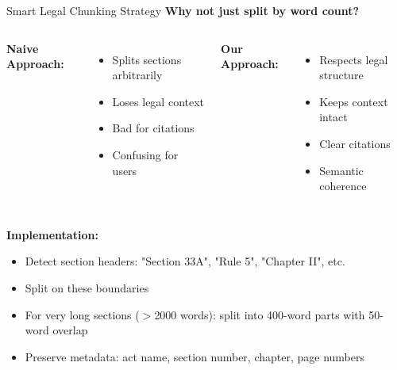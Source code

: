 \documentclass[11pt,aspectratio=16:9]{beamer}
\begin{document}
\begin{frame}{Smart Legal Chunking Strategy}
    \textbf{Why not just split by word count?}
    
    \begin{columns}
        \textbf{Naive Approach:}
        \begin{itemize}
            \item [--] Splits sections arbitrarily
            \item [--] Loses legal context
            \item [--] Bad for citations
            \item [--] Confusing for users
        \end{itemize}
        
        \textbf{Our Approach:}
        \begin{itemize}
            \item [+] Respects legal structure
            \item [+] Keeps context intact
            \item [+] Clear citations
            \item [+] Semantic coherence
        \end{itemize}
    \end{columns}
    
    \vspace{0.8cm}
    
    \textbf{Implementation:}
    \begin{itemize}
        \item Detect section headers: "Section 33A", "Rule 5", "Chapter II", etc.
        \item Split on these boundaries
        \item For very long sections ($>$2000 words): split into 400-word parts with 50-word overlap
        \item Preserve metadata: act name, section number, chapter, page numbers
    \end{itemize}
\end{frame}
\end{document}
